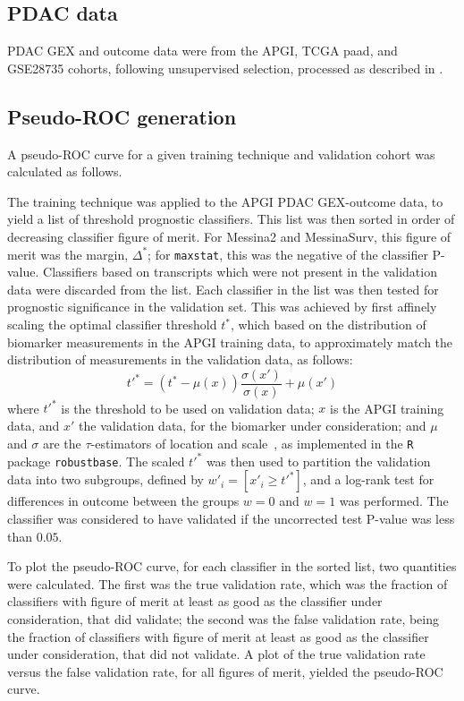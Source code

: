 \documentclass[dissertation.tex]{subfiles}
\begin{document}
\subsection{\texorpdfstring{\acrshort{PDAC}}{PDAC} data}
\gls{PDAC} \gls{GEX} and outcome data were from the \gls{APGI}, \gls{TCGA} paad, and GSE28735 cohorts, following unsupervised selection, processed as described in .

\subsection{Pseudo-\texorpdfstring{\acrshort{ROC}}{ROC} generation}
A pseudo-\gls{ROC} curve for a given training technique and validation cohort was calculated as follows.

The training technique was applied to the \gls{APGI} \gls{PDAC} \gls{GEX}-outcome data, to yield a list of threshold prognostic classifiers.  This list was then sorted in order of decreasing classifier figure of merit.  For Messina2 and MessinaSurv, this figure of merit was the margin, $\Delta^*$; for \texttt{maxstat}, this was the negative of the classifier P-value.  Classifiers based on transcripts which were not present in the validation data were discarded from the list.  Each classifier in the list was then tested for prognostic significance in the validation set.  This was achieved by first affinely scaling the optimal classifier threshold $t^*$, which based on the distribution of biomarker measurements in the \gls{APGI} training data, to approximately match the distribution of measurements in the validation data, as follows: 
\begin{equation*}
t'^* = \left(t^* - \mu(x)\right)\frac{\sigma(x')}{\sigma(x)} + \mu(x')
\end{equation*}
where $t'^*$ is the threshold to be used on validation data; $x$ is the \gls{APGI} training data, and $x'$ the validation data, for the biomarker under consideration; and $\mu$ and $\sigma$ are the $\tau$-estimators of location and scale~\cite{Maronna2002}, as implemented in the \texttt{R} package \texttt{robustbase}.  The scaled $t'^*$  was then used to partition the validation data into two subgroups, defined by $w'_i = [x'_i \geq t'^*]$, and a log-rank test for differences in outcome between the groups $w = 0$ and $w = 1$ was performed.  The classifier was considered to have validated if the uncorrected test P-value was less than $0.05$.

To plot the pseudo-\gls{ROC} curve, for each classifier in the sorted list, two quantities were calculated.  The first was the true validation rate, which was the fraction of classifiers with figure of merit at least as good as the classifier under consideration, that did validate; the second was the false validation rate, being the fraction of classifiers with figure of merit at least as good as the  classifier under consideration, that did not validate.  A plot of the true validation rate versus the false validation rate, for all figures of merit, yielded the pseudo-\gls{ROC} curve.
\end{document}
